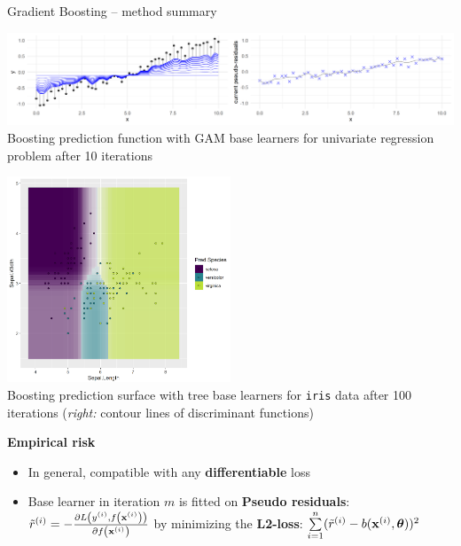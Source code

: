 \documentclass[11pt,compress,t,notes=noshow, xcolor=table]{beamer}
\newcommand{\highlight}[1]{\textcolor{hlcol}{\textbf{#1}}}
\begin{document}
\begin{vbframe}{Gradient Boosting -- method summary}
\begin{minipage}{0.45\textwidth}
  \centering
  \includegraphics[width=\textwidth, trim=0 0 450 0, clip]{
  figure/illustration_gaussian_huber_2_10} \\
  \tiny{Boosting prediction function with GAM base learners for univariate 
  regression problem after 10 iterations}
\end{minipage}%
\hfill
\begin{minipage}{0.45\textwidth}
  \centering
  \includegraphics[width=0.5\textwidth]{
  figure/boosting_multiclass_100_single} \\
  \tiny{Boosting prediction surface with tree base learners for \texttt{iris} 
  data after 100 iterations (\textit{right:} contour lines of discriminant 
  functions)}
\end{minipage}

\framebreak

\footnotesize

\highlight{Empirical risk}

\begin{itemize}
  \item In general, compatible with any \textbf{differentiable} loss
  \item Base learner in iteration $m$ is fitted on \textbf{Pseudo residuals}: \\
  $\tilde{r}^{(i)} = - \frac{\partial{L\left(y^{(i)}, f\left(\mathbf{x}^{(i)}\right)\right)}}{\partial f\left(\mathbf{x}^{(i)}\right)}$ by minimizing the \textbf{L2-loss}: $\sum\limits_{i=1}^n (\tilde{r}^{(i)} - b(\mathbf{x}^{(i)}, \bm{\theta}))^2$
\end{itemize}


\end{vbframe}
\end{document}
